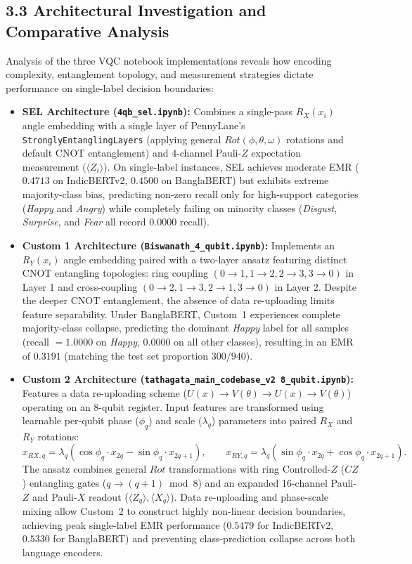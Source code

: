 \documentclass[11pt]{article}
\begin{document}
\subsection*{3.3 Architectural Investigation and Comparative Analysis}

Analysis of the three VQC notebook implementations reveals how encoding complexity, entanglement topology, and measurement strategies dictate performance on single-label decision boundaries:

\begin{itemize}[leftmargin=*]
    \item \textbf{SEL Architecture (\texttt{4qb\_sel.ipynb}):} Combines a single-pass $R_X(x_i)$ angle embedding with a single layer of PennyLane's \texttt{StronglyEntanglingLayers} (applying general $Rot(\phi,\theta,\omega)$ rotations and default CNOT entanglement) and 4-channel Pauli-$Z$ expectation measurement ($\langle Z_i \rangle$). On single-label instances, SEL achieves moderate EMR ($0.4713$ on IndicBERTv2, $0.4500$ on BanglaBERT) but exhibits extreme majority-class bias, predicting non-zero recall only for high-support categories (\emph{Happy} and \emph{Angry}) while completely failing on minority classes (\emph{Disgust}, \emph{Surprise}, and \emph{Fear} all record $0.0000$ recall).
    
    \item \textbf{Custom 1 Architecture (\texttt{Biswanath\_4\_qubit.ipynb}):} Implements an $R_Y(x_i)$ angle embedding paired with a two-layer ansatz featuring distinct CNOT entangling topologies: ring coupling $(0\to1, 1\to2, 2\to3, 3\to0)$ in Layer 1 and cross-coupling $(0\to2, 1\to3, 2\to1, 3\to0)$ in Layer 2. Despite the deeper CNOT entanglement, the absence of data re-uploading limits feature separability. Under BanglaBERT, Custom~1 experiences complete majority-class collapse, predicting the dominant \emph{Happy} label for all samples (recall $= 1.0000$ on \emph{Happy}, $0.0000$ on all other classes), resulting in an EMR of $0.3191$ (matching the test set proportion $300/940$).
    
    \item \textbf{Custom 2 Architecture (\texttt{tathagata\_main\_codebase\_v2 8\_qubit.ipynb}):} Features a data re-uploading scheme ($U(x) \to V(\theta) \to U(x) \to V(\theta)$) operating on an 8-qubit register. Input features are transformed using learnable per-qubit phase ($\phi_q$) and scale ($\lambda_q$) parameters into paired $R_X$ and $R_Y$ rotations:
    \[
    x_{RX, q} = \lambda_q (\cos\phi_q \cdot x_{2q} - \sin\phi_q \cdot x_{2q+1}), \qquad
    x_{RY, q} = \lambda_q (\sin\phi_q \cdot x_{2q} + \cos\phi_q \cdot x_{2q+1}).
    \]
    The ansatz combines general $Rot$ transformations with ring Controlled-$Z$ ($CZ$) entangling gates ($q \to (q+1)\bmod 8$) and an expanded 16-channel Pauli-$Z$ and Pauli-$X$ readout ($\langle Z_q \rangle, \langle X_q \rangle$). Data re-uploading and phase-scale mixing allow Custom~2 to construct highly non-linear decision boundaries, achieving peak single-label EMR performance ($0.5479$ for IndicBERTv2, $0.5330$ for BanglaBERT) and preventing class-prediction collapse across both language encoders.
\end{itemize}
\end{document}
